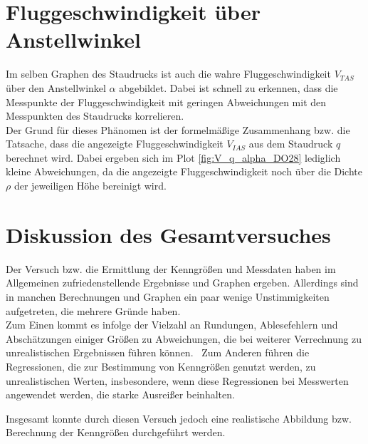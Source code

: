 \section{Fluggeschwindigkeit über Anstellwinkel}

Im selben Graphen des Staudrucks ist auch die wahre Fluggeschwindigkeit $V_{TAS}$ über den Anstellwinkel $\alpha$ abgebildet. Dabei ist schnell zu erkennen, dass die Messpunkte der Fluggeschwindigkeit mit geringen Abweichungen mit den Messpunkten des Staudrucks korrelieren. \\
Der Grund für dieses Phänomen ist der formelmäßige Zusammenhang bzw. die Tatsache, dass die angezeigte Fluggeschwindigkeit $V_{IAS}$ aus dem Staudruck $q$ berechnet wird. Dabei ergeben sich im Plot \ref{fig:V_q_alpha_DO28} lediglich kleine Abweichungen, da die angezeigte Fluggeschwindigkeit noch über die Dichte $\rho$ der jeweiligen Höhe bereinigt wird.

\section{Diskussion des Gesamtversuches}

Der Versuch bzw. die Ermittlung der Kenngrößen und Messdaten haben im Allgemeinen zufriedenstellende Ergebnisse und Graphen ergeben. Allerdings sind in manchen Berechnungen und Graphen ein paar wenige Unstimmigkeiten aufgetreten, die mehrere Gründe haben.\\
Zum Einen kommt es infolge der Vielzahl an Rundungen, Ablesefehlern und Abschätzungen einiger Größen zu Abweichungen, die bei weiterer Verrechnung zu unrealistischen Ergebnissen führen können. \ Zum Anderen führen die Regressionen, die zur Bestimmung von Kenngrößen genutzt werden, zu unrealistischen Werten, insbesondere, wenn diese Regressionen bei Messwerten angewendet werden, die starke Ausreißer beinhalten.

Insgesamt konnte durch diesen Versuch jedoch eine realistische Abbildung bzw. Berechnung der Kenngrößen durchgeführt werden.